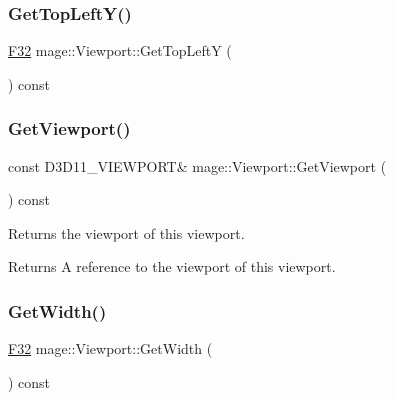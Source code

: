 \subsubsection{\texorpdfstring{Get\+Top\+Left\+Y()}{GetTopLeftY()}}
{\footnotesize\ttfamily \hyperlink{namespacemage_aa97e833b45f06d60a0a9c4fc22ae02c0}{F32} mage\+::\+Viewport\+::\+Get\+Top\+LeftY (\begin{DoxyParamCaption}{ }\end{DoxyParamCaption}) const\hspace{0.3cm}{\ttfamily [noexcept]}}

\hypertarget{classmage_1_1_viewport_ad4bb75cdfbd137182898caad913de4d1}{}\label{classmage_1_1_viewport_ad4bb75cdfbd137182898caad913de4d1} 
\subsubsection{\texorpdfstring{Get\+Viewport()}{GetViewport()}}
{\footnotesize\ttfamily const D3\+D11\+\_\+\+V\+I\+E\+W\+P\+O\+RT\& mage\+::\+Viewport\+::\+Get\+Viewport (\begin{DoxyParamCaption}{ }\end{DoxyParamCaption}) const\hspace{0.3cm}{\ttfamily [noexcept]}}

Returns the viewport of this viewport.

\begin{DoxyReturn}{Returns}
A reference to the viewport of this viewport. 
\end{DoxyReturn}
\hypertarget{classmage_1_1_viewport_a851c6322e8ee31af58309a3c0f382d10}{}\label{classmage_1_1_viewport_a851c6322e8ee31af58309a3c0f382d10} 
\subsubsection{\texorpdfstring{Get\+Width()}{GetWidth()}}
{\footnotesize\ttfamily \hyperlink{namespacemage_aa97e833b45f06d60a0a9c4fc22ae02c0}{F32} mage\+::\+Viewport\+::\+Get\+Width (\begin{DoxyParamCaption}{ }\end{DoxyParamCaption}) const\hspace{0.3cm}{\ttfamily [noexcept]}}


